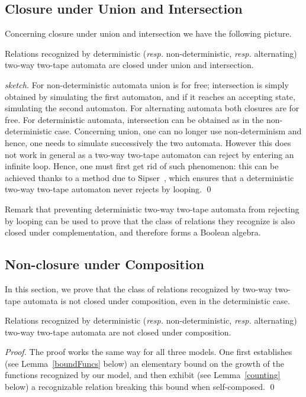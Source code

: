 \documentclass[runningheads, envcountsame, a4paper]{llncs}
\newcommand*{\resp}{\emph{resp.}\xspace}
\newcommand*{\model}{two-way two-tape automaton\xspace}
\renewcommand*{\models}{two-way two-tape automata\xspace}
\begin{document}
\subsection{Closure under Union and Intersection}

Concerning closure under union and intersection we have the following picture.

\begin{lemma}
  Relations recognized by deterministic (\resp non-deterministic, \resp
  alternating) \models are closed under union and intersection.
\end{lemma}

\begin{proof}[sketch]
  For non-deterministic automata union is for free; intersection is simply
  obtained by simulating the first automaton, and if it reaches an
  accepting state, simulating the second automaton. For alternating
  automata both closures are for free. For deterministic automata,
  intersection can be obtained as in the non-deterministic case. Concerning
  union, one can no longer use non-determinism and hence, one needs to
  simulate successively the two automata.  However this does not work in
  general as a \model can reject by entering an infinite loop. Hence, one
  must first get rid of such phenomenon: this can be achieved thanks to a
  method due to Sipser~\cite{Sipser80}, which ensures that a deterministic
  \model never rejects by looping.
\qed\end{proof}

Remark that preventing deterministic \models from rejecting by looping can
be used to prove that the class of relations they recognize is also closed under
complementation, and therefore forms a Boolean algebra.


\subsection{Non-closure under Composition}

In this section, we prove that the class of relations recognized by \models
is not closed under composition, even in the deterministic case.


\begin{theorem} \label{theo:composition}
  Relations recognized by deterministic (\resp non-deterministic, \resp
  alternating) \models are not closed under composition.
\end{theorem}

\begin{proof}
  The proof works the same way for all three models. One first establishes
  (see Lemma~\ref{boundFuncs} below) an elementary bound on the growth of
  the functions recognized by our model, and then exhibit (see
  Lemma~\ref{counting} below) a recognizable relation breaking this bound
  when self-composed.
\qed\end{proof}
\end{document}
